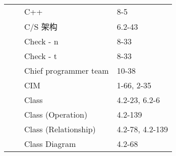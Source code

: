 \documentclass[twocolumn]{article}
\begin{document}
\begin{tabular}{ | >{\bfseries}m{0.5em} | >{\bfseries}m{1em} | m{12em} | m{8em} |}
 &  & C++ & 8-5\\ \cline{3-4}
 &  & C/S 架构 & 6.2-43\\ \cline{3-4}
 &  & Check - n & 8-33\\ \cline{3-4}
 &  & Check - t & 8-33\\ \cline{3-4}
 &  & Chief programmer team & 10-38\\ \cline{3-4}
 &  & CIM & 1-66, 2-35\\ \cline{3-4}
 &  & Class & 4.2-23, 6.2-6\\ \cline{3-4}
 &  & Class (Operation) & 4.2-139\\ \cline{3-4}
 &  & Class (Relationship) & 4.2-78, 4.2-139\\ \cline{3-4}
 &  & Class Diagram & 4.2-68\\ \cline{1-4}
\end{tabular}
\end{document}
